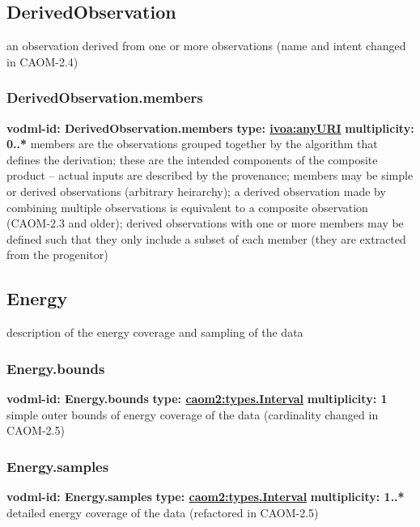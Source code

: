   \subsection{DerivedObservation}
  \label{sect:DerivedObservation}
    an observation derived from one or more observations (name and intent changed in CAOM-2.4)

    \subsubsection{DerivedObservation.members}
      \textbf{vodml-id: DerivedObservation.members} \newline
      \textbf{type: \hyperref[sect:ivoa]{ivoa:anyURI}} \newline
      \textbf{multiplicity: 0..*} \newline
      members are the observations grouped together by the algorithm that defines the derivation; these are the intended components of the composite product -- actual inputs are described by the provenance; members may be simple or derived observations (arbitrary heirarchy); a derived observation made by combining multiple observations is equivalent to a composite observation (CAOM-2.3 and older); derived observations with one or more members may be defined such that they only include a subset of each member (they are extracted from the progenitor)

  \subsection{Energy}
  \label{sect:Energy}
    description of the energy coverage and sampling of the data

    \subsubsection{Energy.bounds}
      \textbf{vodml-id: Energy.bounds} \newline
      \textbf{type: \hyperref[sect:types.Interval]{caom2:types.Interval}} \newline
      \textbf{multiplicity: 1} \newline
      simple outer bounds of energy coverage of the data (cardinality changed in CAOM-2.5)

    \subsubsection{Energy.samples}
      \textbf{vodml-id: Energy.samples} \newline
      \textbf{type: \hyperref[sect:types.Interval]{caom2:types.Interval}} \newline
      \textbf{multiplicity: 1..*} \newline
      detailed energy coverage of the data (refactored in CAOM-2.5)

